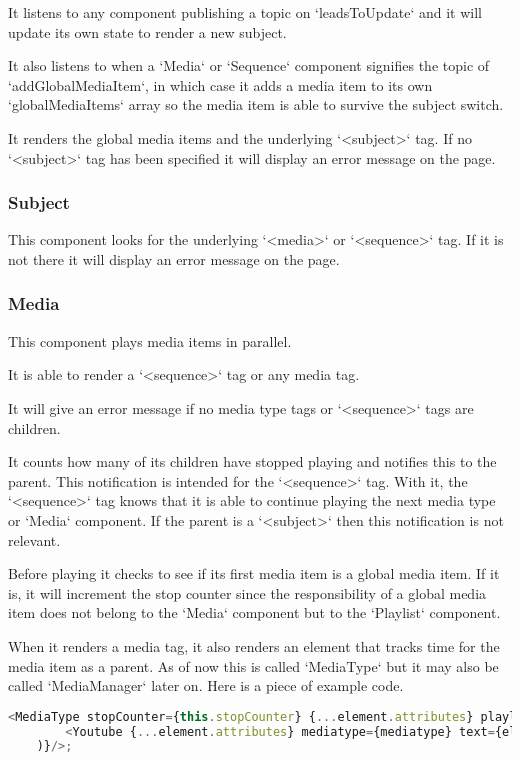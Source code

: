 It listens to any component publishing a topic on `leadsToUpdate` and it will update its own state to render a new subject. 

It also listens to when a `Media` or `Sequence` component signifies the topic of `addGlobalMediaItem`, in which case it adds a media item to its own `globalMediaItems` array so the media item is able to survive the subject switch. 

It renders the global media items and the underlying `<subject>` tag. If no `<subject>` tag has been specified it will display an error message on the page.

\subsubsection{Subject}
This component looks for the underlying `<media>` or `<sequence>` tag. If it is not there it will display an error message on the page.

\subsubsection{Media}
This component plays media items in parallel. 

It is able to render a `<sequence>` tag or any media tag. 

It will give an error message if no media type tags or `<sequence>` tags are children.

It counts how many of its children have stopped playing and notifies this to the parent. This notification is intended for the `<sequence>` tag. With it, the `<sequence>` tag knows that it is able to continue playing the next media type or `Media` component. If the parent is a `<subject>` then this notification is not relevant.

Before playing it checks to see if its first media item is a global media item. If it is, it will increment the stop counter since the responsibility of a global media item does not belong to the `Media` component but to the `Playlist` component.

When it renders a media tag, it also renders an element that tracks time for the media item as a parent. As of now this is called `MediaType` but it may also be called `MediaManager` later on. Here is a piece of example code.

\begin{lstlisting}[language=JavaScript, caption=An example of how each media item has a general component to manage itself for time tracking (among other things)., label=javascript:media_type_render]
    <MediaType stopCounter={this.stopCounter} {...element.attributes} playlist={element} key={this.state.key + i} render={mediatype => (
        <Youtube {...element.attributes} mediatype={mediatype} text={element.text} playlist={element} />
    )}/>;
\end{lstlisting}

